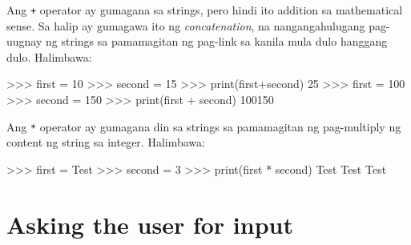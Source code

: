\documentclass[10pt,]{book}
\newenvironment{Shaded}{}{}
\newcommand{\BuiltInTok}[1]{\textcolor[rgb]{0.00,0.50,0.00}{#1}}
\newcommand{\DecValTok}[1]{\textcolor[rgb]{0.25,0.63,0.44}{#1}}
\newcommand{\NormalTok}[1]{#1}
\newcommand{\OperatorTok}[1]{\textcolor[rgb]{0.40,0.40,0.40}{#1}}
\newcommand{\StringTok}[1]{\textcolor[rgb]{0.25,0.44,0.63}{#1}}
\begin{document}
Ang \texttt{+} operator ay gumagana sa strings, pero hindi ito addition
sa mathematical sense. Sa halip ay gumagawa ito ng \emph{concatenation},
na nangangahulugang pag-uugnay ng strings sa pamamagitan ng pag-link sa
kanila mula dulo hanggang dulo. Halimbawa:


\begin{Shaded}
\begin{Highlighting}[]
\OperatorTok{\textgreater{}\textgreater{}\textgreater{}}\NormalTok{ first }\OperatorTok{=} \DecValTok{10}
\OperatorTok{\textgreater{}\textgreater{}\textgreater{}}\NormalTok{ second }\OperatorTok{=} \DecValTok{15}
\OperatorTok{\textgreater{}\textgreater{}\textgreater{}} \BuiltInTok{print}\NormalTok{(first}\OperatorTok{+}\NormalTok{second)}
\DecValTok{25}
\OperatorTok{\textgreater{}\textgreater{}\textgreater{}}\NormalTok{ first }\OperatorTok{=} \StringTok{\textquotesingle{}100\textquotesingle{}}
\OperatorTok{\textgreater{}\textgreater{}\textgreater{}}\NormalTok{ second }\OperatorTok{=} \StringTok{\textquotesingle{}150\textquotesingle{}}
\OperatorTok{\textgreater{}\textgreater{}\textgreater{}} \BuiltInTok{print}\NormalTok{(first }\OperatorTok{+}\NormalTok{ second)}
\DecValTok{100150}
\end{Highlighting}
\end{Shaded}

Ang \texttt{*} operator ay gumagana din sa strings sa pamamagitan ng
pag-multiply ng content ng string sa integer. Halimbawa:

\begin{Shaded}
\begin{Highlighting}[]
\OperatorTok{\textgreater{}\textgreater{}\textgreater{}}\NormalTok{ first }\OperatorTok{=} \StringTok{\textquotesingle{}Test \textquotesingle{}}
\OperatorTok{\textgreater{}\textgreater{}\textgreater{}}\NormalTok{ second }\OperatorTok{=} \DecValTok{3}
\OperatorTok{\textgreater{}\textgreater{}\textgreater{}} \BuiltInTok{print}\NormalTok{(first }\OperatorTok{*}\NormalTok{ second)}
\NormalTok{Test Test Test}
\end{Highlighting}
\end{Shaded}

\section{Asking the user for input}\label{asking-the-user-for-input}

\end{document}

